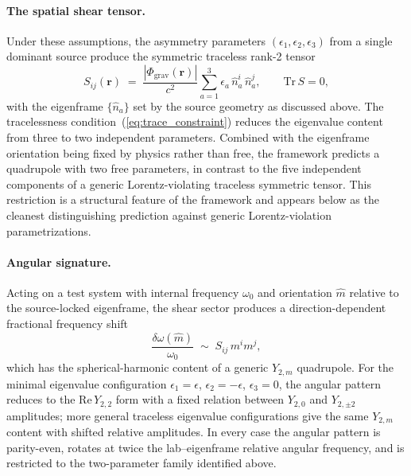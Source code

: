 \documentclass[a4paper,fleqn]{cas-dc}
\theoremstyle{thmstyleone}%
\theoremstyle{thmstyletwo}%
\begin{document}
\paragraph{The spatial shear tensor.}
Under these assumptions, the asymmetry parameters
$(\epsilon_1,\epsilon_2,\epsilon_3)$ from a single dominant
source produce the symmetric traceless rank-2 tensor
\begin{equation}
    S_{ij}(\mathbf{r})
    \;=\;
    \frac{|\Phi_{\mathrm{grav}}(\mathbf{r})|}{c^2}
    \sum_{a=1}^{3}\epsilon_a\,\hat{n}_a^i\,\hat{n}_a^j,
    \qquad
    \mathrm{Tr}\,S=0,
    \label{eq:S_tensor}
\end{equation}
with the eigenframe $\{\hat{n}_a\}$ set by the source geometry
as discussed above. The tracelessness
condition~(\ref{eq:trace_constraint}) reduces the eigenvalue
content from three to two independent parameters. Combined
with the eigenframe orientation being fixed by physics rather
than free, the framework predicts a quadrupole with two free
parameters, in contrast to the five independent components of a
generic Lorentz-violating traceless symmetric tensor. This
restriction is a structural feature of the framework and
appears below as the cleanest distinguishing prediction
against generic Lorentz-violation parametrizations.

\paragraph{Angular signature.}
Acting on a test system with internal frequency $\omega_0$ and
orientation $\hat{m}$ relative to the source-locked eigenframe,
the shear sector produces a direction-dependent fractional
frequency shift
\begin{equation}
    \frac{\delta\omega(\hat{m})}{\omega_0}
    \;\sim\;
    S_{ij}\,m^i m^j,
    \label{eq:freq_shift_angular}
\end{equation}
which has the spherical-harmonic content of a generic
$Y_{2,m}$ quadrupole. For the minimal eigenvalue configuration
$\epsilon_1=\epsilon$, $\epsilon_2=-\epsilon$, $\epsilon_3=0$,
the angular pattern reduces to the $\mathrm{Re}\,Y_{2,2}$ form
with a fixed relation between $Y_{2,0}$ and $Y_{2,\pm 2}$
amplitudes; more general traceless eigenvalue configurations
give the same $Y_{2,m}$ content with shifted relative
amplitudes. In every case the angular pattern is parity-even,
rotates at twice the lab--eigenframe relative angular
frequency, and is restricted to the two-parameter family
identified above.
\end{document}
